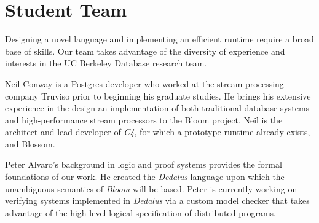 \section{Student Team}

Designing a novel language and implementing an efficient runtime require a broad base of skills.  Our team takes advantage of the 
diversity of experience and interests in the UC Berkeley Database research team.  

Neil Conway is a Postgres developer who worked at the stream processing company Truviso prior to beginning his graduate studies.  He brings
his extensive experience in the design an implementation of both traditional database systems and high-performance stream processors
to the Bloom project.  Neil is the architect and lead developer of \emph{C4}, for which a prototype runtime already exists, and Blossom.   

Peter Alvaro's background in logic and proof systems provides the formal foundations of our work.  He created the \emph{Dedalus} language
upon which the unambiguous semantics of \emph{Bloom} will be based.  Peter is currently working on verifying systems implemented in \emph{Dedalus}
via a custom model checker that takes advantage of the high-level logical specification of distributed programs.